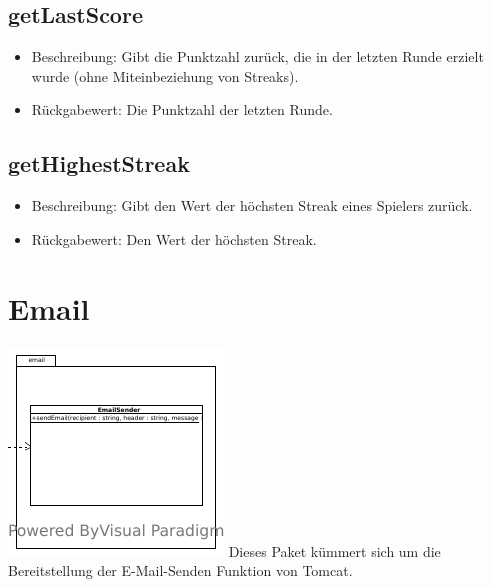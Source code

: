 \documentclass[a4paper]{scrreprt}
\begin{document}
    \subsection{getLastScore}
    \begin{itemize}
        \item Beschreibung: Gibt die Punktzahl zurück, die in der letzten Runde erzielt wurde (ohne Miteinbeziehung von Streaks).
        \item Rückgabewert: Die Punktzahl der letzten Runde.
    \end{itemize}
    \subsection{getHighestStreak}
    \begin{itemize}
        \item Beschreibung: Gibt den Wert der höchsten Streak eines Spielers zurück.
        \item Rückgabewert: Den Wert der höchsten Streak.
    \end{itemize}

    \section{Email}
    \includegraphics[width=\textwidth]{img/package/email.pdf}
    Dieses Paket kümmert sich um die Bereitstellung der E-Mail-Senden Funktion von Tomcat.
\end{document}

